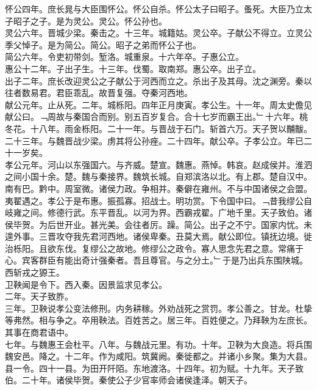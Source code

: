 \documentclass{zhvt-classic}
\begin{document}
\hspace*{2em}怀公四年。庶长晁与大臣围怀公。怀公自杀。怀公太子曰昭子。蚤死。大臣乃立太子昭子之子。是为灵公。灵公。怀公孙也。\\
\hspace*{2em}灵公六年。晋城少梁。秦击之。十三年。城籍姑。灵公卒。子献公不得立。立灵公季父悼子。是为简公。简公。昭子之弟而怀公子也。\\
\hspace*{2em}简公六年。令吏初带剑。堑洛。城重泉。十六年卒。子惠公立。\\
\hspace*{2em}惠公十二年。子出子生。十三年。伐蜀。取南郑。惠公卒。出子立。\\
\hspace*{2em}出子二年。庶长改迎灵公之子献公于河西而立之。杀出子及其母。沈之渊旁。秦以往者数易君。君臣乖乱。故晋复强。夺秦河西地。\\
\hspace*{2em}献公元年。止从死。二年。城栎阳。四年正月庚寅。孝公生。十一年。周太史儋见献公曰。﹁周故与秦国合而别。别五百岁复合。合十七岁而霸王出。﹂十六年。桃冬花。十八年。雨金栎阳。二十一年。与晋战于石门。斩首六万。天子贺以黼黻。二十三年。与魏晋战少梁。虏其将公孙痤。二十四年。献公卒。子孝公立。年已二十一岁矣。\\
\hspace*{2em}孝公元年。河山以东强国六。与齐威。楚宣。魏惠。燕悼。韩哀。赵成侯并。淮泗之间小国十余。楚。魏与秦接界。魏筑长城。自郑滨洛以北。有上郡。楚自汉中。南有巴。黔中。周室微。诸侯力政。争相并。秦僻在雍州。不与中国诸侯之会盟。夷翟遇之。孝公于是布惠。振孤寡。招战士。明功赏。下令国中曰。﹁昔我缪公自岐雍之间。修德行武。东平晋乱。以河为界。西霸戎翟。广地千里。天子致伯。诸侯毕贺。为后世开业。甚光美。会往者厉。躁。简公。出子之不宁。国家内忧。未遑外事。三晋攻夺我先君河西地。诸侯卑秦。丑莫大焉。献公即位。镇抚边境。徙治栎阳。且欲东伐。复缪公之故地。修缪公之政令。寡人思念先君之意。常痛于心。宾客群臣有能出奇计强秦者。吾且尊官。与之分土。﹂于是乃出兵东围陕城。西斩戎之獂王。\\
\hspace*{2em}卫鞅闻是令下。西入秦。因景监求见孝公。\\
\hspace*{2em}二年。天子致胙。\\
\hspace*{2em}三年。卫鞅说孝公变法修刑。内务耕稼。外劝战死之赏罚。孝公善之。甘龙。杜挚等弗然。相与争之。卒用鞅法。百姓苦之。居三年。百姓便之。乃拜鞅为左庶长。其事在商君语中。\\
\hspace*{2em}七年。与魏惠王会杜平。八年。与魏战元里。有功。十年。卫鞅为大良造。将兵围魏安邑。降之。十二年。作为咸阳。筑冀阙。秦徙都之。并诸小乡聚。集为大县。县一令。四十一县。为田开阡陌。东地渡洛。十四年。初为赋。十九年。天子致伯。二十年。诸侯毕贺。秦使公子少官率师会诸侯逢泽。朝天子。\\
\end{document}
